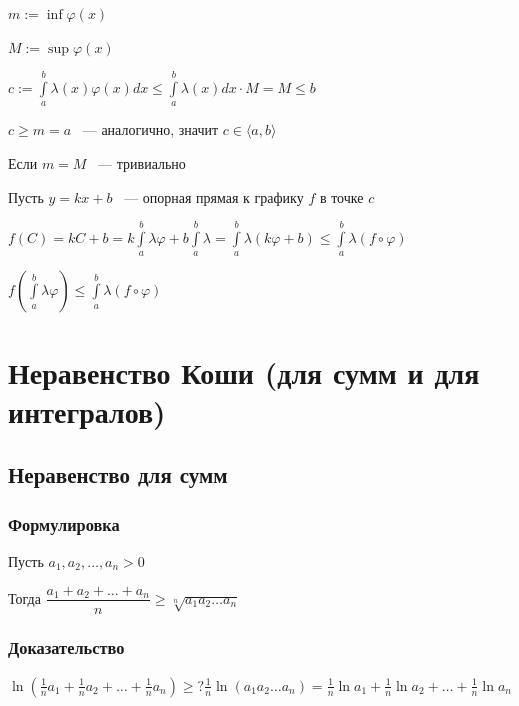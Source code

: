\documentclass{article}
\begin{document}
            $m := \inf \varphi(x)$
            
            $M := \sup \varphi(x)$
            
            $c := \int\limits^b_a \lambda(x) \varphi(x) dx \leq \int\limits^b_a \lambda(x) dx \cdot M = M \leq b$
            
            $c \geq m = a$ ~--- аналогично, значит $c \in \langle a, b \rangle$
            
            Если $m = M$ ~--- тривиально
            
            Пусть $y = kx + b$ ~--- опорная прямая к графику $f$ в точке $c$
            
            $f(C) = kC + b = k \int\limits^b_a \lambda \varphi + b \int\limits^b_a \lambda = \int\limits^b_a \lambda(k\varphi + b) \leq \int\limits^b_a \lambda (f \circ \varphi)$
            
            $f\left( \int\limits^b_a \lambda \varphi \right) \leq \int\limits^b_a \lambda (f \circ \varphi)$
            
    \newpage
    
    \section{Неравенство Коши (для сумм и для интегралов)}
    
        \subsection{Неравенство для сумм}
        
            \subsubsection{Формулировка}
            
                Пусть $a_1, a_2, \ldots, a_n > 0$
                
                Тогда $\dfrac{a_1 + a_2 + \ldots + a_n}{n} \geq \sqrt[n]{a_1 a_2 \ldots a_n}$
                
            \subsubsection{Доказательство}
            
                $\ln(\frac{1}{n} a_1 + \frac{1}{n} a_2 + \ldots + \frac{1}{n} a_n) \geq? \frac{1}{n} \ln(a_1 a_2 \ldots a_n) = \frac{1}{n} \ln{a_1} + \frac{1}{n} \ln{a_2} + \ldots + \frac{1}{n} \ln{a_n}$
                
\end{document}
